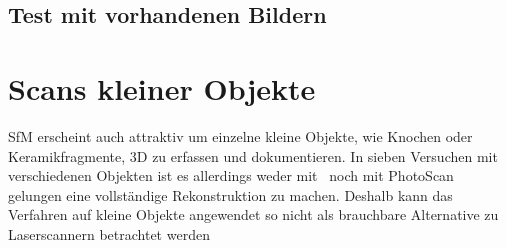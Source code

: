 		\subsection{Test mit vorhandenen Bildern} \label{res:test_vorhandene_bilder}
		
	\section{Scans kleiner Objekte}
		SfM erscheint auch attraktiv um einzelne kleine Objekte, wie Knochen oder Keramikfragmente, 3D zu erfassen und dokumentieren. In sieben Versuchen mit verschiedenen Objekten ist es allerdings weder mit \dronarch\ noch mit PhotoScan gelungen eine vollständige Rekonstruktion zu machen. Deshalb kann das Verfahren auf kleine Objekte angewendet so nicht als brauchbare Alternative zu Laserscannern betrachtet werden
			